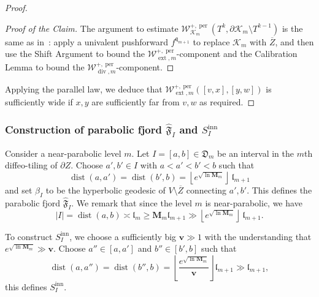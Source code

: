 \documentclass{amsart}
\newcommand{\1}{{\mathbb 1 }}
\newcommand{\ext}{{\operatorname{ext}}}
\renewcommand{\div}{{\operatorname{div}}}
\newcommand{\Width}{{\mathcal W}}
\newcommand{\bbv}{{\mathbf{v}}}
\newcommand{\bM}{{\mathbf M}}
\newcommand{\qq}{\mathfrak{q}}
\newcommand{\length}{{\mathfrak l}}
\newcommand\inn{{\operatorname{inn}}}
\newcommand\per{{\operatorname{per}}}
\theoremstyle{remark}
\numberwithin{equation}{section}
\theoremstyle{definition}
\newcommand{\filled}{{\mathcal {K} }}
\newcommand{\dist}{\operatorname{dist}}
\begin{document}
\begin{proof}
\begin{proof}[Proof of the Claim]
The argument to estimate $\Width^{+,\per}_{\filled_{m}}(T^k,\partial \filled_{m}\setminus T^{k-1})$ is the same as in~\cite[Lemma 10.5]{DL22}: apply a univalent pushforward $f^{\qq_{m+1}}$ to replace $\filled_{m}$ with $\overline Z$, and then use the Shift Argument to bound the $\Width^{+,\per}_{\ext,m}$-component and the Calibration Lemma to bound the $\Width^{+,\per}_{\div,m}$-component.   
\end{proof}

Applying the parallel law, we deduce that $\Width^{+,\per}_{\ext,m} ([v,x],[y,w])$ is sufficiently wide if $x,y$ are sufficiently far from $v,w$ as required. 
\end{proof}





\subsubsection{Construction of parabolic fjord $\widehat{\mathfrak F}_I$ and $S^\inn _I$}\label{sss:dfn:regular} Consider a near-parabolic level $m$. Let $I=[a,b]\in \mathfrak{D}_m$ be an interval in the $m$th diffeo-tiling of $\partial Z$. Choose $a', b'\in I$ with $a<a'<b'<b$ such that \[\dist(a,a')=\dist(b',b) =\left\lfloor e^{\sqrt{ \ln \bM_{m}}}\right\rfloor \  \length_{m+1} \]
and set $\beta_I$ to be the hyperbolic geodesic of $V\setminus \overline Z$ connecting $a',b'$. This defines the parabolic fjord $\widehat{\mathfrak F}_I$.
We remark that since the level $m$ is near-parabolic, we have
$$
|I| = \dist(a,b) \asymp \length_m \geq \bM_m \length_{m+1} \gg \left\lfloor e^{\sqrt{ \ln \bM_{m}}}\right\rfloor \  \length_{m+1}.
$$

To construct $S^\inn _I$, we choose a sufficiently big $\bbv\gg 1$ with the understanding that $e^{\sqrt{ \ln \bM_{m}}} \gg \bbv$.
Choose $a''\in [a,a']$ and $b''\in [b',b]$ such that
\begin{equation}
\label{eq:dfn:S^inn}
    \dist(a,a'')=\dist(b'',b) =\left\lfloor \frac{e^{\sqrt{ \ln \bM_{m}}}}{ \bbv}\right\rfloor \length_{m+1} \gg \length_{m+1},
\end{equation} 
this defines $S^\inn _I$.
\end{document}
